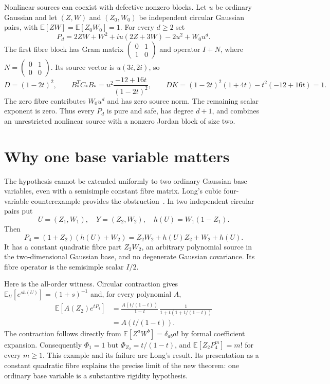 \documentclass[11pt]{article}
\theoremstyle{definition}\newtheorem{definition}[theorem]{Definition}
\theoremstyle{remark}\newtheorem{remark}[theorem]{Remark}
\newcommand{\E}{\mathbb E}
\begin{document}
Nonlinear sources can coexist with defective nonzero blocks. Let $u$ be ordinary Gaussian and let $(Z,W)$ and
$(Z_0,W_0)$ be independent circular Gaussian pairs, with
$\E[ZW]=\E[Z_0W_0]=1$. For every $d\ge2$ set
\[
 P_d=2ZW+W^2+iu(2Z+3W)-2u^2+W_0u^d.
\]
The first fibre block has Gram matrix
$\left(\begin{smallmatrix}0&1\\1&0\end{smallmatrix}\right)$
and operator $I+N$, where
$N=\left(\begin{smallmatrix}0&1\\0&0\end{smallmatrix}\right)$.
Its source vector is $u(3i,2i)$, so
\[
 D=(1-2t)^2,\qquad
 B_*^TC_*B_*=u^2\frac{-12+16t}{(1-2t)^2},\qquad
 DK=(1-2t)^2(1+4t)-t^2(-12+16t)=1.
\]
The zero fibre contributes $W_0u^d$ and has zero source norm.
The remaining scalar exponent is zero. Thus every $P_d$ is
pure and safe, has degree $d+1$, and combines an unrestricted
nonlinear source with a nonzero Jordan block of size two.

\section{Why one base variable matters}

The hypothesis cannot be extended uniformly to two ordinary
Gaussian base variables, even with a semisimple constant fibre
matrix. Long's cubic four-variable counterexample provides the
obstruction~\cite[Proposition~4.1]{Long}. In two independent
circular pairs put
\[
 U=(Z_1,W_1),\quad Y=(Z_2,W_2),\quad h(U)=W_1(1-Z_1).
\]
Then
\[
 P_4=(1+Z_2)(h(U)+W_2)
     =Z_2W_2+h(U)Z_2+W_2+h(U).
\]
It has a constant quadratic fibre part $Z_2W_2$, an arbitrary
polynomial source in the two-dimensional Gaussian base, and
no degenerate Gaussian covariance. Its fibre operator is the
semisimple scalar $I/2$.

Here is the all-order witness. Circular contraction gives
$\E_{U}[e^{s h(U)}]=(1+s)^{-1}$ and, for every polynomial $A$,
\begin{align*}
 \E[A(Z_2)e^{tP_4}]
 &=\frac{A(t/(1-t))}{1-t}\,
       \frac1{1+t(1+t/(1-t))}\\
 &=A(t/(1-t)).
\end{align*}
The contraction follows directly from
$\E[Z^aW^b]=\delta_{ab}a!$ by formal coefficient expansion.
Consequently $\Phi_1=1$ but $\Phi_{Z_2}=t/(1-t)$, and
$\E[Z_2P_4^m]=m!$ for every $m\ge1$. This example and its
failure are Long's result. Its presentation as a constant
quadratic fibre explains the precise limit of the new theorem:
one ordinary base variable is a substantive rigidity hypothesis.
\end{document}
